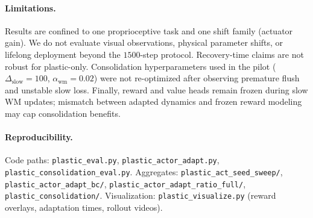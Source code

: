 \paragraph{Limitations.}
Results are confined to one proprioceptive task and one shift family (actuator gain).
We do not evaluate visual observations, physical parameter shifts, or lifelong deployment beyond the $1500$-step protocol.
Recovery-time claims are not robust for plastic-only.
Consolidation hyperparameters used in the pilot ($\Delta_{\mathrm{slow}}{=}100$, $\alpha_{\mathrm{wm}}{=}0.02$) were not re-optimized after observing premature flush and unstable slow loss.
Finally, reward and value heads remain frozen during slow WM updates; mismatch between adapted dynamics and frozen reward modeling may cap consolidation benefits.

\paragraph{Reproducibility.}
Code paths: \texttt{plastic\_eval.py}, \texttt{plastic\_actor\_adapt.py}, \texttt{plastic\_consolidation\_eval.py}.
Aggregates: \texttt{plastic\_act\_seed\_sweep/}, \texttt{plastic\_actor\_adapt\_bc/}, \texttt{plastic\_actor\_adapt\_ratio\_full/}, \texttt{plastic\_consolidation/}.
Visualization: \texttt{plastic\_visualize.py} (reward overlays, adaptation times, rollout videos).
